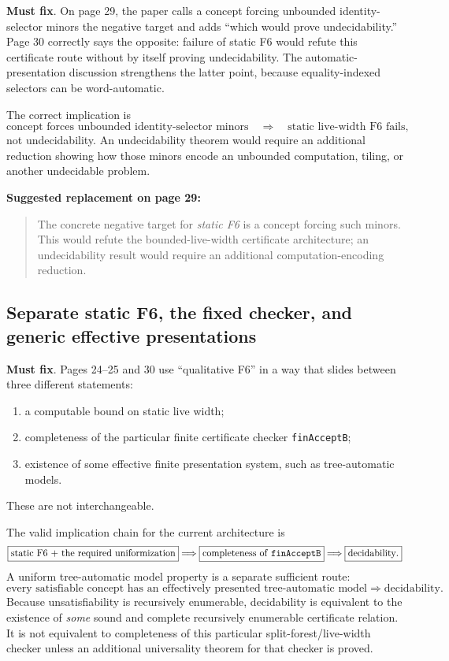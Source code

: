 \documentclass[11pt]{article}
\newcommand{\mustfix}{\textcolor{reviewred}{\textbf{Must fix}}}
\newcommand{\code}[1]{\texttt{#1}}
\begin{document}
\mustfix. On page 29, the paper calls a concept forcing unbounded identity-selector minors the negative target and adds ``which would prove undecidability.'' Page 30 correctly says the opposite: failure of static F6 would refute this certificate route without by itself proving undecidability. The automatic-presentation discussion strengthens the latter point, because equality-indexed selectors can be word-automatic.

The correct implication is
\[
  \text{concept forces unbounded identity-selector minors}
  \quad\Longrightarrow\quad
  \text{static live-width F6 fails},
\]
not undecidability. An undecidability theorem would require an additional reduction showing how those minors encode an unbounded computation, tiling, or another undecidable problem.

\textbf{Suggested replacement on page 29:}
\begin{quote}
The concrete negative target for \emph{static F6} is a concept forcing such minors. This would refute the bounded-live-width certificate architecture; an undecidability result would require an additional computation-encoding reduction.
\end{quote}

\subsection{Separate static F6, the fixed checker, and generic effective presentations}

\mustfix. Pages 24--25 and 30 use ``qualitative F6'' in a way that slides between three different statements:
\begin{enumerate}[label=(\alph*),leftmargin=2em]
  \item a computable bound on static live width;
  \item completeness of the particular finite certificate checker \code{finAcceptB};
  \item existence of some effective finite presentation system, such as tree-automatic models.
\end{enumerate}
These are not interchangeable.

The valid implication chain for the current architecture is
\[
\boxed{\text{static F6 + the required uniformization}}
\Longrightarrow
\boxed{\text{completeness of \code{finAcceptB}}}
\Longrightarrow
\boxed{\text{decidability}.}
\]
A uniform tree-automatic model property is a separate sufficient route:
\[
\boxed{\text{every satisfiable concept has an effectively presented tree-automatic model}}
\Longrightarrow
\boxed{\text{decidability}.}
\]
Because unsatisfiability is recursively enumerable, decidability is equivalent to the existence of \emph{some} sound and complete recursively enumerable certificate relation. It is not equivalent to completeness of this particular split-forest/live-width checker unless an additional universality theorem for that checker is proved.
\end{document}
